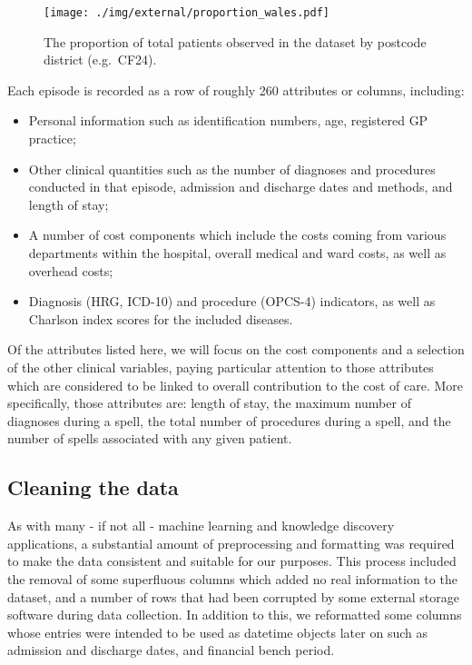 \begin{figure}[htbp]
    \centering
    \texttt{[image: ./img/external/proportion\_wales.pdf]}
    \caption{The proportion of total patients observed in the dataset by
        postcode district (e.g.\ CF24).}
\end{figure}

Each episode is recorded as a row of roughly 260 attributes or columns,
including:

\begin{itemize}
    \item Personal information such as identification numbers, age, registered
        GP practice;
    \item Other clinical quantities such as the number of diagnoses and
        procedures conducted in that episode, admission and discharge dates and
        methods, and length of stay;
    \item A number of cost components which include the costs coming from
        various departments within the hospital, overall medical and ward costs,
        as well as overhead costs;
    \item Diagnosis (HRG, ICD-10) and procedure (OPCS-4) indicators, as well as
        Charlson index scores for the included diseases.
\end{itemize}

Of the attributes listed here, we will focus on the cost components and a
selection of the other clinical variables, paying particular attention to those
attributes which are considered to be linked to overall contribution to the cost
of care. More specifically, those attributes are: length of stay, the maximum
number of diagnoses during a spell, the total number of procedures during a
spell, and the number of spells associated with any given patient.

\subsection{Cleaning the data}\label{subsec:formatting}

As with many \-- if not all \-- machine learning and knowledge discovery
applications, a substantial amount of preprocessing and formatting was required
to make the data consistent and suitable for our purposes. This process included
the removal of some superfluous columns which added no real information to the
dataset, and a number of rows that had been corrupted by some external storage
software during data collection. In addition to this, we reformatted some
columns whose entries were intended to be used as datetime objects later on such
as admission and discharge dates, and financial bench period.
